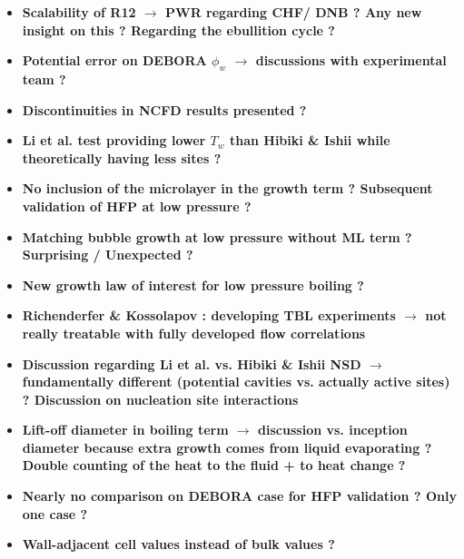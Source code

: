 \documentclass[8pt, a4paper]{article}
\begin{document}
\begin{itemize}
\setlength{\itemsep}{20pt}

\item \textbf{Scalability of R12 $\rightarrow$ PWR regarding CHF/ DNB ? Any new insight on this ? Regarding the ebullition cycle ?}

\item \textbf{Potential error on DEBORA $\phi_{w}$ $\rightarrow$ discussions with experimental team ? }

\item \textbf{Discontinuities in NCFD results presented ?}

\item \textbf{Li et al. test providing lower $T_{w}$ than Hibiki \& Ishii while theoretically having less sites ?}

\item \textbf{No inclusion of the microlayer in the growth term ? Subsequent validation of HFP at low pressure ?}

\item \textbf{Matching bubble growth at low pressure without ML term ? Surprising / Unexpected ?}

\item \textbf{New growth law of interest for low pressure boiling ?}

\item \textbf{Richenderfer \& Kossolapov : developing TBL experiments $\rightarrow$ not really treatable with fully developed flow correlations}

\item \textbf{Discussion regarding Li et al. vs. Hibiki \& Ishii NSD $\rightarrow$ fundamentally different (potential cavities vs. actually active sites) ? Discussion on nucleation site interactions}

\item \textbf{Lift-off diameter in boiling term $\rightarrow$ discussion vs. inception diameter because extra growth comes from liquid evaporating ? Double counting of the heat to the fluid + to heat change ?}


\item \textbf{Nearly no comparison on DEBORA case for HFP validation ? Only one case ?}

\item \textbf{Wall-adjacent cell values instead of bulk values ?}

\end{itemize}
\end{document}
